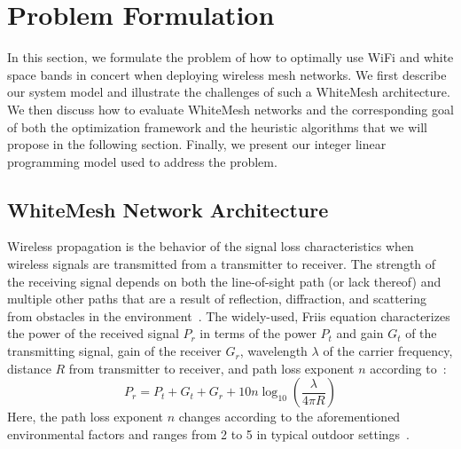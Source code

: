 \section{Problem Formulation}
\label{sec:problemformulation}

%

In this section, we formulate the problem of how to optimally 
use WiFi and white space bands in concert when deploying wireless 
mesh networks.  We first describe our system model and illustrate 
the challenges of such a WhiteMesh architecture.  We then discuss
how to evaluate WhiteMesh networks and the corresponding goal of
both the optimization framework and the heuristic algorithms that 
we will propose in the following section.  Finally, we present 
our integer linear programming model used to address the problem. 
 
\subsection{WhiteMesh Network Architecture}
\label{subsec:architecture}

Wireless propagation is the behavior of the signal loss characteristics 
when wireless signals are transmitted from a transmitter to receiver.
The strength of the receiving signal depends on both the line-of-sight
path (or lack thereof) and multiple other paths that are a result of 
reflection, diffraction, and scattering from obstacles in the 
environment~\cite{andersen1995propagation}. The widely-used, Friis
equation characterizes the power of the received signal $P_r$ in terms 
of the power $P_t$ and gain $G_t$ of the transmitting signal, gain of 
the receiver $G_r$, wavelength $\lambda$ of the carrier frequency, 
distance $R$ from transmitter to receiver, and path loss exponent $n$ according 
to~\cite{friis}:
\begin{equation}
\label{eq:friis}
P_r=P_t+G_t+G_r+10n \log_{10}\left( \frac{\lambda}{4\pi R}\right)
\end{equation}
Here, the path loss exponent $n$ changes according to the
aforementioned environmental factors and ranges from 2 to 5 in typical
outdoor settings~\cite{rappaport}.



